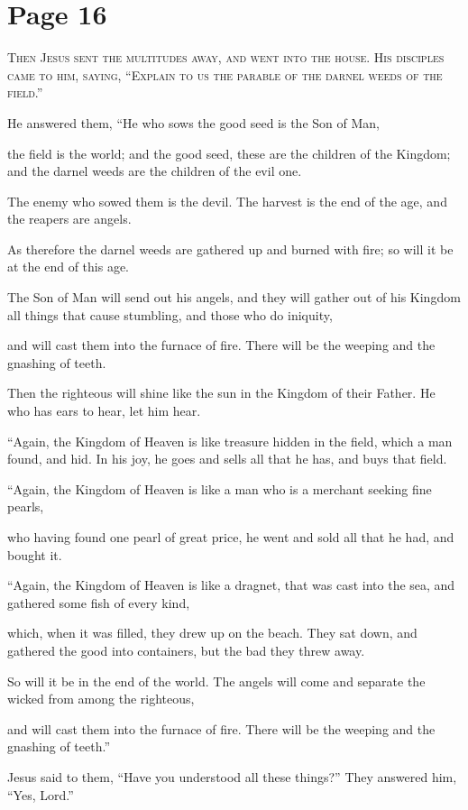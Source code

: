 \chapterornament
\section*{Page 16}

\lettrine{T}{hen Jesus sent the multitudes away, and went into the house. His disciples came to him, saying, “Explain to us the parable of the darnel weeds of the field.”}

He answered them, “He who sows the good seed is the Son of Man,

the field is the world; and the good seed, these are the children of the Kingdom; and the darnel weeds are the children of the evil one.

The enemy who sowed them is the devil. The harvest is the end of the age, and the reapers are angels.

As therefore the darnel weeds are gathered up and burned with fire; so will it be at the end of this age.

The Son of Man will send out his angels, and they will gather out of his Kingdom all things that cause stumbling, and those who do iniquity,

and will cast them into the furnace of fire. There will be the weeping and the gnashing of teeth.

Then the righteous will shine like the sun in the Kingdom of their Father. He who has ears to hear, let him hear.

“Again, the Kingdom of Heaven is like treasure hidden in the field, which a man found, and hid. In his joy, he goes and sells all that he has, and buys that field.

“Again, the Kingdom of Heaven is like a man who is a merchant seeking fine pearls,

who having found one pearl of great price, he went and sold all that he had, and bought it.

“Again, the Kingdom of Heaven is like a dragnet, that was cast into the sea, and gathered some fish of every kind,

which, when it was filled, they drew up on the beach. They sat down, and gathered the good into containers, but the bad they threw away.

So will it be in the end of the world. The angels will come and separate the wicked from among the righteous,

and will cast them into the furnace of fire. There will be the weeping and the gnashing of teeth.”

Jesus said to them, “Have you understood all these things?” They answered him, “Yes, Lord.”

